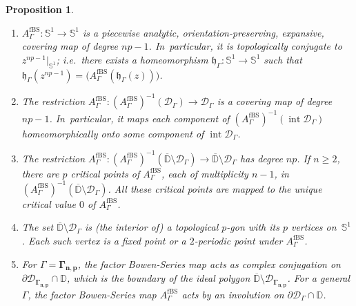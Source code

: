 \documentclass[10pt,a4paper]{amsart}
\newcommand{\ie}{i.e.\ }
\newcommand{\skpt}{\par\smallskip}
\newtheorem{proposition}[lemma]{Proposition}
\theoremstyle{definition}
\theoremstyle{remark}
\newcommand{\D}{\mathbb{D}}
\DeclareMathOperator{\Int}{int}
\begin{document}
\skpt
\begin{proposition}\label{factor_bs_prop}
\begin{enumerate}
\item\label{factor_bs_prop1} $A_{\Gamma}^{\mathrm{fBS}}:\mathbb{S}^1\to\mathbb{S}^1$ is a piecewise analytic, orientation-preserving, expansive, covering map of degree $np-1$. In~particular, it is topologically conjugate to $z^{np-1}\vert_{\mathbb{S}^1}$; \ie there exists a homeomorphism $\mathfrak{h}_\Gamma: {\mathbb{S}^1} \to {\mathbb{S}^1}$ such that $\mathfrak{h}_\Gamma (z^{np-1}) = \big( A_{\Gamma}^{\mathrm{fBS}}(\mathfrak{h}_\Gamma (z))\big)$.

\item\label{factor_bs_prop2} The restriction $A_{\Gamma}^{\mathrm{fBS}}: \left(A_{\Gamma}^{\mathrm{fBS}}\right)^{-1}(\mathcal{D}_{\Gamma})\to \mathcal{D}_{\Gamma}$ is a covering map of degree $np-1$. In~particular, it maps each component of $\left(A_{\Gamma}^{\mathrm{fBS}}\right)^{-1}(\Int{\mathcal{D}_{\Gamma}})$ homeomorphically onto some component of $\Int{\mathcal{D}_{\Gamma}}$.

\item\label{factor_bs_prop3} The restriction $A_{\Gamma}^{\mathrm{fBS}}: \left(A_{\Gamma}^{\mathrm{fBS}}\right)^{-1}(\overline{\D}\setminus\mathcal{D}_{\Gamma})\to \overline{\D}\setminus\mathcal{D}_{\Gamma}$ has degree $np$. If $n\geq 2$, there are $p$ critical points of $A_{\Gamma}^{\mathrm{fBS}}$, each of multiplicity $n-1$, in $\left(A_{\Gamma}^{\mathrm{fBS}}\right)^{-1}(\overline{\D}\setminus\mathcal{D}_{\Gamma})$.
All these critical points are mapped to the unique critical value $0$ of $A_{\Gamma}^{\mathrm{fBS}}$.

\item\label{factor_bs_prop4} The set $\overline{\D}\setminus\mathcal{D}_\Gamma$ is (the interior of) a topological $p$-gon with its $p$ vertices on~$\mathbb{S}^1$. Each such vertex is a fixed point or a $2$-periodic point under $A_{\Gamma}^{\mathrm{fBS}}$.

\item\label{factor_bs_prop5} For $\Gamma=\pmb{\Gamma_{n,p}}$, the factor Bowen-Series map acts as complex conjugation on $\partial\mathcal{D}_{\pmb{\Gamma_{n,p}}}\cap\D$, which is the boundary of the ideal polygon $\overline{\D}\setminus\mathcal{D}_{\pmb{\Gamma_{n,p}}}$. For a general $\Gamma$, the factor Bowen-Series map $A_{\Gamma}^{\mathrm{fBS}}$ acts by an involution on $\partial\mathcal{D}_{\Gamma}\cap\D$.
\end{enumerate}
\end{proposition}
\end{document}

